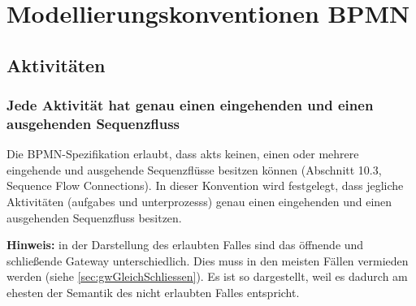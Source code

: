 \documentclass[12pt,report]{snetTeaching}
\begin{document}
\chapter{Modellierungskonventionen BPMN}


\section{Aktivitäten}


\subsection{Jede Aktivität hat genau einen eingehenden und einen ausgehenden Sequenzfluss}
\label{konv:oneSeqenceFlow}

Die BPMN-Spezifikation erlaubt, dass \glspl{akt} keinen, einen oder mehrere eingehende und ausgehende Sequenzflüsse besitzen können (Abschnitt 10.3, Sequence Flow Connections). In dieser Konvention wird festgelegt, dass jegliche Aktivitäten (\glspl{aufgabe} und \glspl{unterprozess}) genau einen eingehenden und einen ausgehenden Sequenzfluss besitzen.


\begin{Rahmen}
	\hfill
\end{Rahmen}

\textbf{Hinweis:}
in der Darstellung des erlaubten Falles sind das öffnende und schließende Gateway unterschiedlich. Dies muss in den meisten Fällen vermieden werden (siehe \ref{sec:gwGleichSchliessen}). Es ist so dargestellt, weil es dadurch am ehesten der Semantik des nicht erlaubten Falles entspricht.
\end{document}
